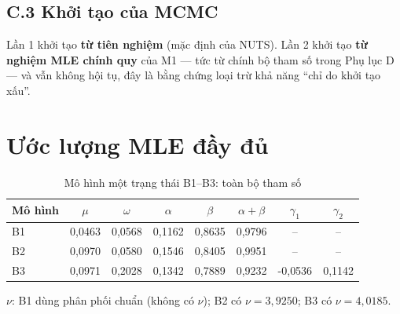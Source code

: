 \documentclass[11pt,a4paper]{article}
\begin{document}
\subsection*{C.3 Khởi tạo của MCMC}
Lần 1 khởi tạo \textbf{từ tiên nghiệm} (mặc định của NUTS). Lần 2 khởi tạo
\textbf{từ nghiệm MLE chính quy} của M1 --- tức từ chính bộ tham số trong Phụ lục D --- và
vẫn không hội tụ, đây là bằng chứng loại trừ khả năng ``chỉ do khởi tạo xấu''.

\section{Ước lượng MLE đầy đủ}

\begin{table}[H]\centering\footnotesize
\caption{Mô hình một trạng thái B1--B3: toàn bộ tham số}
\begin{tabularx}{\textwidth}{l C C C C C C C}
\toprule
\textbf{Mô hình} & $\mu$ & $\omega$ & $\alpha$ & $\beta$ & $\alpha+\beta$ & $\gamma_1$ & $\gamma_2$ \\
\midrule
B1 & 0{,}0463 & 0{,}0568 & 0{,}1162 & 0{,}8635 & 0{,}9796 & -- & -- \\
B2 & 0{,}0970 & 0{,}0580 & 0{,}1546 & 0{,}8405 & 0{,}9951 & -- & -- \\
B3 & 0{,}0971 & 0{,}2028 & 0{,}1342 & 0{,}7889 & 0{,}9232 & -0{,}0536 & 0{,}1142 \\
\bottomrule
\end{tabularx}
\begin{tablenotes}\footnotesize\item $\nu$: B1 dùng phân phối chuẩn (không có $\nu$); B2 có $\nu=3{,}9250$; B3 có $\nu=4{,}0185$.
\end{tablenotes}
\end{table}
\end{document}
